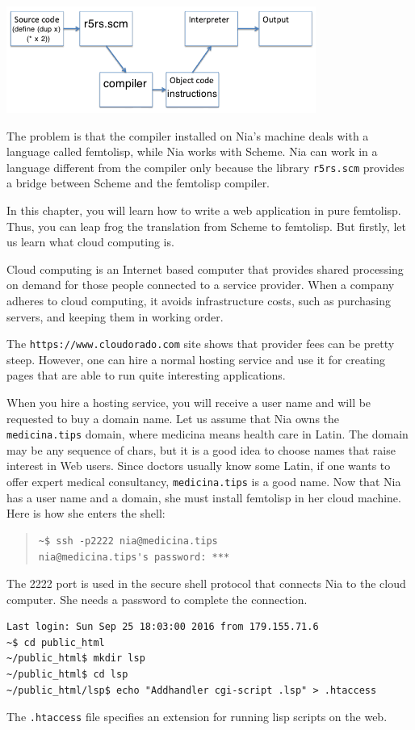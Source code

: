 \documentclass[a4paper,12pt]{book}
\begin{document}
\includegraphics[scale=0.8]{figs/source.png}


The problem is that the
compiler installed on
Nia's machine deals with a language
 called femtolisp, while Nia 
 works with  Scheme. Nia can work in a
 language different from the compiler
 only because the library \verb|r5rs.scm| provides
 a bridge between Scheme and the
 femtolisp compiler.
 

 In this chapter, you will learn how
 to write a web application in pure
 femtolisp. Thus, you can leap frog
 the translation from Scheme to femtolisp.
 But firstly,
 let us learn what cloud computing is.

 Cloud computing is an Internet based
 computer that provides shared
 processing  on demand for those people
 connected to a service provider.
 When a  company adheres to cloud computing,
 it avoids infrastructure costs,
 such as purchasing servers, and keeping
 them in working order.

 The \verb|https://www.cloudorado.com|
 site shows that provider fees
 can be pretty steep.
 However, one can hire a normal
 hosting service and use it for
 creating pages that are able to
 run quite interesting applications.

 When you hire a hosting service,
 you will receive a user name and
 will be requested to
 buy a domain name. Let us
 assume that Nia owns the
 \verb|medicina.tips| domain,
 where {\sc medicina} means
 health care in Latin. The domain
 may be any sequence of chars,
 but it is a good idea to choose
 names that raise interest in
 Web users. Since doctors usually
 know some Latin, if one wants to offer
 expert medical consultancy, \verb|medicina.tips|
 is a good name.
 Now that Nia has a user name and a
 domain, she must install femtolisp
 in her cloud machine. Here is how
 she enters the shell:
\begin{quote}
\begin{verbatim}
~$ ssh -p2222 nia@medicina.tips
nia@medicina.tips's password: ***
\end{verbatim}
\end{quote}
The 2222 port is used in the secure shell protocol
that connects Nia to the cloud computer.
She needs a password to complete the connection.
\begin{Verbatim}[fontsize=\small,
    frame=single,
    framerule=0.5mm]
Last login: Sun Sep 25 18:03:00 2016 from 179.155.71.6
~$ cd public_html
~/public_html$ mkdir lsp
~/public_html$ cd lsp
~/public_html/lsp$ echo "Addhandler cgi-script .lsp" > .htaccess
\end{Verbatim}
The \verb|.htaccess| file specifies 
an extension for running lisp scripts on the web.
\end{document}
